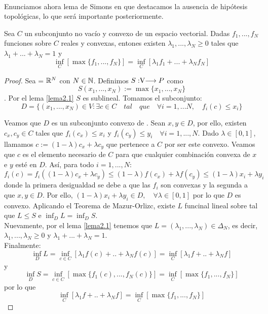 	\paragraph{} Enunciamos ahora lema de Simons\cite{Simons2008} en que destacamos la ausencia de hipótesis topológicas, lo que será importante posteriormente.
	
	\begin{lemaBox}\label{Simons}
		Sea $ C $ un subconjunto no vacío y convexo de un espacio vectorial. Dadas $ f_1, ..., f_N $  funciones sobre $ C $ reales y convexas, entones existen $ \lambda_1, ..., \lambda_N \geq 0$ tales que $ \lambda_1+ ...+ \lambda_N = 1$ y
		\[
		\inf_C\left[ \max \{f_1, ..., f_N\}\right] = \inf_C \left[ \lambda_1 f_1+ ...+\lambda_N f_N \right]
		\] 
	\end{lemaBox}
	\begin{proof}
		Sea  \vecSpace = $ \mathbb{R}^N $ con $ N \in \mathbb{N} $. Definimos $S:\vecSpace \longrightarrow P $ como \[ S(x_1, ..., x_N) := \max \{x_1, ..., x_N\} \]. Por el lema \ref{lema2.1} $ S $ es sublineal. Tomamos el subconjunto:
		\[ 
		D = \{ (x_1, ..., x_N)\in V: \exists c \in C \quad tal \quad que \quad \forall i = 1,...N,\quad f_i(c) \leq x_i \}
		\]
		
		Veamos que $ D $ es un subconjunto convexo de \vecSpace. Sean $ x, y \in D $, por ello, existen $ c_x, c_y \in C $ tales que $ f_i (c_x) \leq x_i  $ y $ f_i (c_y) \leq y_i \quad \forall i=1,...,N $. Dado $ \lambda \in [0,1] $, llamamos $ c := (1-\lambda)c_x + \lambda c_y $ que pertenece a $ C $ por ser este convexo. Veamos que $ c $ es el elemento necesario de $ C $ para que cualquier combinación convexa de $ x $ e $ y $ esté en $ D $. Así, para todo $ i =1,...,N  $:	
		\[
		f_i(c) = f_i((1-\lambda)c_x + \lambda c_y) \leq (1-\lambda)f(c_x) + \lambda f(c_y) \leq (1-\lambda)x_i + \lambda y_i 
		\]
		donde la primera desigualdad se debe a que las $ f_i $ son convexas y la segunda a que $ x,y \in D $. Por ello, $ (1-\lambda)x_i + \lambda y_i \in D , \quad \forall \lambda \in [0,1] $ por lo que $ D $ es convexo. Aplicando el Teorema de Mazur-Orlizc, existe $ L $ funcinal lineal sobre \vecSpace tal que $ L \leq S $ e $ \inf_D L = \inf_D S $. \\
		
		Nuevamente, por el lema \ref{lema2.1} tenemos que $ L = (\lambda_1,...,\lambda_N) \in \Delta_N$, es decir, $ \lambda_1, ..., \lambda_N \geq 0$ y $ \lambda_1+ ...+ \lambda_N = 1$. \\
		
		Finalmente:
		\[
		\inf_D L = \inf_{c\in C} \left[ \lambda_1 f(c) + ..+ \lambda_N f(c) \right] = \inf_{C} \left[ \lambda_1 f + ..+ \lambda_N f \right]
		\]
		y
		\[
		\inf_D S = \inf_{c\in C} \left[ \max \{f_1(c), ..., f_N(c)\} \right] = \inf_C\left[ \max \{f_1, ..., f_N\}\right] 
		\]
		por lo que 
		\[ \inf_{C} \left[ \lambda_1 f + ..+ \lambda_N f \right] = \inf_C\left[ \max \{f_1, ..., f_N\}\right]  \] 
	\end{proof}

